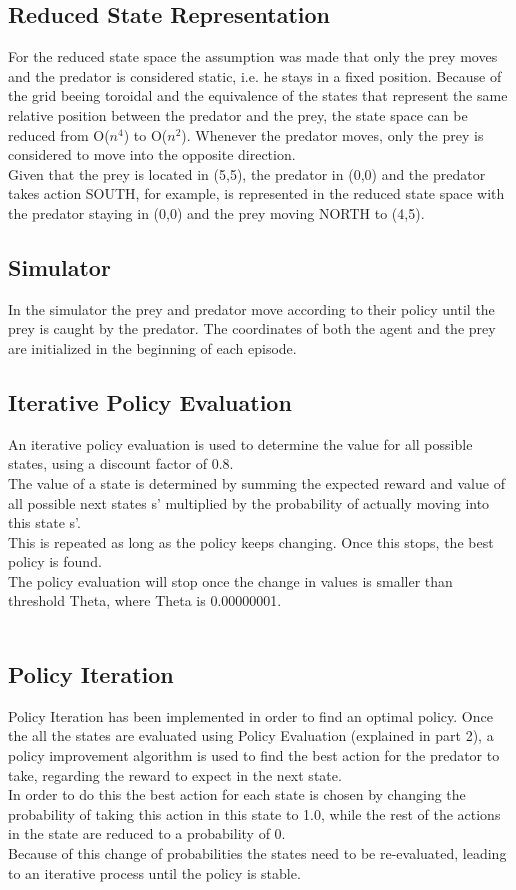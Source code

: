 \documentclass[11pt]{article}
\begin{document}
\subsection{Reduced State Representation}
For the reduced state space the assumption was made that only the prey moves and the predator is considered static, i.e. he stays in a fixed position. Because of the grid beeing toroidal and the equivalence of the states that represent the same relative position between the predator and the prey, the state space can be reduced from O($n^4$) to O($n^2$). Whenever the predator moves, only the prey is considered to move into the opposite direction.\\
Given that the prey is located in (5,5), the predator in (0,0) and the predator takes action SOUTH, for example, is represented in the reduced state space with the predator staying in (0,0) and the prey moving NORTH to (4,5).


\subsection{Simulator}
In the simulator the prey and predator move according to their policy until the prey is caught by the predator. The coordinates of both the agent and the prey are initialized in the beginning of each episode.


\subsection{Iterative Policy Evaluation}
An iterative policy evaluation is used to determine the value for all possible states, using a discount factor of 0.8.\\
The value of a state is determined by summing the expected reward and value of all possible next states s' multiplied by the probability of actually moving into this state s'.\\
This is repeated as long as the policy keeps changing. Once this stops, the best policy is found.\\
The policy evaluation will stop once the change in values is smaller than threshold Theta, where Theta is 0.00000001.\cite{1}\\\\


\subsection{Policy Iteration}
Policy Iteration has been implemented in order to find an optimal policy.
Once the all the states are evaluated using  Policy Evaluation (explained in part 2), a policy improvement algorithm is used to find the best action for the predator to take, regarding the reward to expect in the next state.\\
In order to do this the best action for each state is chosen by changing the probability of taking this action in this state to 1.0, while the rest of the actions in the state are reduced to a probability of 0. \\
Because of this change of probabilities the states need to be re-evaluated, leading to an iterative process until the policy is stable. \cite{2}
\end{document}
